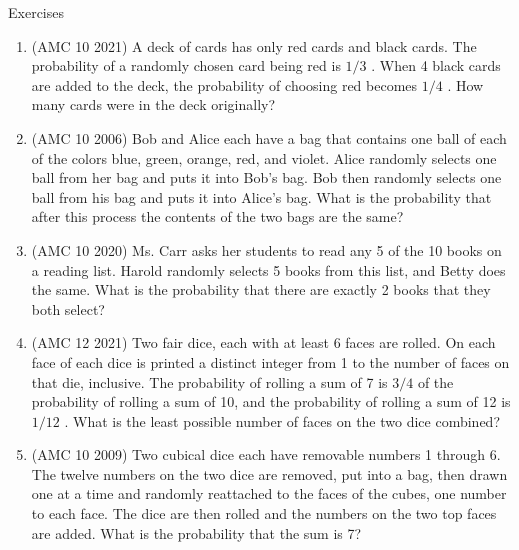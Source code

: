\begin{xcb}{Exercises}
\begin{enumerate}
\begin{hint}
\end{hint}
\item(AMC 10 2021)  A deck of cards has only red cards and black cards. The probability of a randomly chosen card being red is $1/3$ . When 4 black cards are added to the deck, the probability of choosing red becomes $1/4$ . How many cards were in the deck originally?
\item(AMC 10 2006)  Bob and Alice each have a bag that contains one ball of each of the colors blue, green, orange, red, and violet. Alice randomly selects one ball from her bag and puts it into Bob’s bag. Bob then randomly selects one ball from his bag and puts it into Alice’s bag. What is the probability that after this process the contents of the two bags are the same?
\item(AMC 10 2020)  Ms. Carr asks her students to read any 5 of the 10 books on a reading list. Harold randomly selects 5 books from this list, and Betty does the same. What is the probability that there are exactly 2 books that they both select?
\begin{hint}
\end{hint}
\item (AMC 12 2021)  Two fair dice, each with at least 6 faces are rolled. On each face of each dice is printed a distinct integer from 1 to the number of faces on that die, inclusive. The probability of rolling a sum of 7 is $3/4$ of the probability of rolling a sum of 10, and the probability of rolling a sum of 12 is $1/12$ . What is the least possible number of faces on the two dice combined?
\begin{hint}
\end{hint}
\item (AMC 10 2009)  Two cubical dice each have removable numbers 1 through 6. The twelve numbers on the two dice are removed, put into a bag, then drawn one at a time and randomly reattached to the faces of the cubes, one number to each face. The dice are then rolled and the numbers on the two top faces are added. What is the probability that the sum is 7?
\begin{hint}

\end{hint}
\end{enumerate}
\end{xcb}
